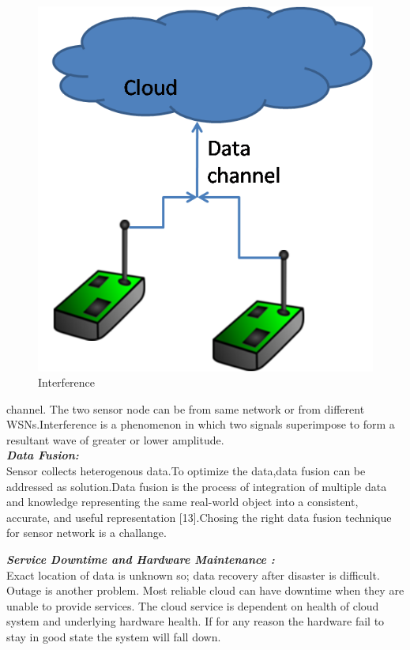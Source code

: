 \documentclass {report}
\begin{document}
\begin{figure}
\begin{center}
\includegraphics [scale=0.5]{interference}
\caption{Interference}
\end{center}
\end{figure}
\newpage

 channel. The two sensor node can be from same network or from different WSNs.Interference is a phenomenon in which two signals superimpose to form a resultant wave of greater or lower amplitude. \\




{\bfseries \emph{Data Fusion:}\\} Sensor collects heterogenous data.To optimize the data,data fusion can be addressed as solution.Data fusion is the process of integration of multiple data and knowledge representing the same real-world object into a consistent, accurate, and useful representation [13].Chosing the right data fusion technique for sensor network is a challange.

{\bfseries \emph{Service Downtime and Hardware Maintenance :}\\} Exact location of data is unknown so; data recovery after disaster is difficult. Outage is another problem. Most reliable cloud can have downtime when they are unable to provide services. The cloud service is dependent on health of cloud system and underlying hardware health. If for any reason the hardware fail to stay in good state the system will fall down.\\
\end{document}
